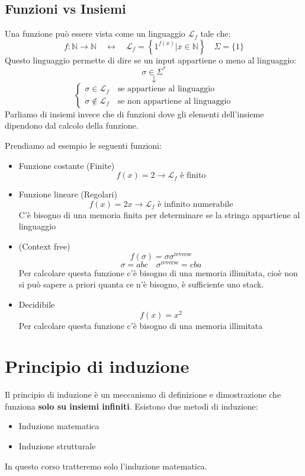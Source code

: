 \documentclass[a4paper]{article}
\begin{document}
\subsection{Funzioni vs Insiemi}
Una funzione può essere vista come un linguaggio \( \mathcal{L}_f \) tale che:
\[
  f: \mathbb{N} \to \mathbb{N} \quad \leftrightarrow \quad
  \mathcal{L}_f = \left\{ 1^{f(x)} \left| x \in \mathbb{N} \right.\right\} \quad
  \Sigma = \{1\}
\] 
Questo linguaggio permette di dire se un input appartiene o meno al linguaggio:
\[
  \sigma  \in \Sigma^*
\] 
\[
  \downarrow
\] 
\[
  \begin{cases}
    \sigma  \in \mathcal{L}_f \quad \text{se appartiene al linguaggio}\\
    \sigma  \notin \mathcal{L}_f \quad \text{se non appartiene al linguaggio}
  \end{cases}
\] 
Parliamo di insiemi invece che di funzioni dove gli elementi dell'insieme dipendono dal
calcolo della funzione.
\begin{example}
  Prendiamo ad esempio le seguenti funzioni:
  \begin{itemize}
    \item Funzione costante (Finite)
      \[
        f(x) = 2 \to \mathcal{L}_f \text{ è finito}
      \] 
    \item Funzione lineare (Regolari)
      \[
        f(x) = 2x \to \mathcal{L}_f \text{ è infinito numerabile}
      \]
      C'è bisogno di una memoria finita per determinare se la stringa appartiene al linguaggio
    \item (Context free)
      \[
        f(\sigma) = \sigma \sigma^{\text{reverse}}
      \] 
      \[
        \sigma = abc \quad \sigma^\text{reverse} = cba
      \] 
      Per calcolare questa funzione c'è bisogno di una memoria illimitata, cioè non
      si può sapere a priori quanta ce n'è bisogno, è sufficiente uno stack.

    \item Decidibile
      \[
        f(x) = x^2
      \] 
      Per calcolare questa funzione c'è bisogno di una memoria illimitata
  \end{itemize}
\end{example}

\label{13-10-D1}

\section{Principio di induzione}
Il principio di induzione è un meccanismo di definizione e dimostrazione che funziona
\textbf{solo su insiemi infiniti}. Esistono due metodi di induzione:
\begin{itemize}
  \item Induzione matematica
  \item Induzione strutturale
\end{itemize}
In questo corso tratteremo solo l'induzione matematica.
\end{document}
